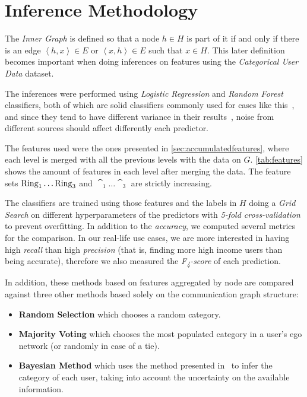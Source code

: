 
\section{Inference Methodology}
\label{sec:inference_methodology}

The \emph{Inner Graph} is defined so that a node $h \in H$ is part of it if and only if there is an edge $\left< h, x \right> \in E$ or $\left< x, h \right> \in E$ such that $x \in H$.
This later definition becomes important when doing inferences on features using the \emph{Categorical User Data} dataset.


The inferences were performed using \emph{Logistic Regression} and \emph{Random Forest} classifiers, both of which are solid classifiers commonly used for cases like this~\cite{binaryevaluation}, and since they tend to have different variance in their results~\cite{ting2016}, noise from different sources should affect differently each predictor.

The features used were the ones presented in \cref{sec:accumulatedfeatures}, where each level is merged with all the previous levels with the data on $G$. \cref{tab:features} shows the amount of features in each level after merging the data. 
The feature sets $\operatorname{Ring}_1 \ldots \operatorname{Ring}_3$ and $\cat_1 \ldots \cat_3$ are strictly
increasing.

The classifiers are trained using those features and the labels in $H$ doing a \emph{Grid Search} on different hyperparameters of the predictors with \emph{5-fold cross-validation} to prevent overfitting. In addition to the \emph{accuracy}, we computed several metrics for the comparison. In our real-life use cases, we are more interested in having high \emph{recall} than high \emph{precision} (that is, finding more high income users than being accurate), therefore we also measured the \emph{F\textsubscript{4}-score} of each prediction.

In addition, these methods based on features aggregated by node are compared against three other methods based solely on the communication graph structure:

\begin{itemize}
	\item \textbf{Random Selection} which chooses a random category.
	\item \textbf{Majority Voting} which chooses the most populated category in a user's ego network (or randomly in case of a tie).
	\item \textbf{Bayesian Method} which uses the method presented in~\cite{fixmanasonam2016} to infer the category of each user,
	taking into account the uncertainty on the available information.
\end{itemize}
